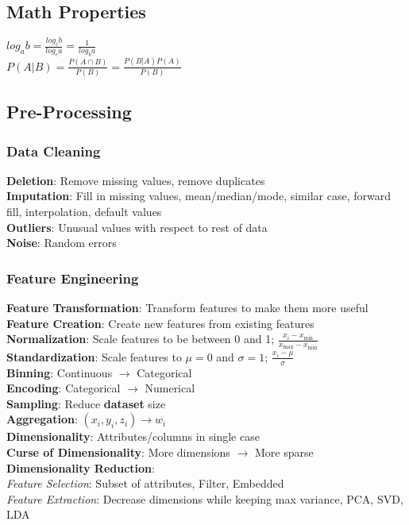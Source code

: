 \documentclass{article}
\author{Ian Chen}
\date{\today}
\begin{document}
    \begin{multicols*}{2}
        \subsection*{Math Properties}
        $log_a b = \frac{log_c b}{log_c a} = \frac{1}{log_b a}$\\
        $P(A|B) = \frac{P(A \cap B)}{P(B)} = \frac{P(B|A)P(A)}{P(B)}$\\
        \subsection*{Pre-Processing}
        \subsubsection*{Data Cleaning}
        \textbf{Deletion}: Remove missing values, remove duplicates\\
        \textbf{Imputation}: Fill in missing values, mean/median/mode, similar case, forward fill,
        interpolation, default values\\
        \textbf{Outliers}: Unusual values with respect to rest of data\\
        \textbf{Noise}: Random errors\\
        \subsubsection*{Feature Engineering}
        \textbf{Feature Transformation}: Transform features to make them more useful\\
        \textbf{Feature Creation}: Create new features from existing features\\
        \textbf{Normalization}: Scale features to be between 0 and 1; $\frac{x_i - x_{\min}}{x_
                {\max} - x_{\min}}$\\
        \textbf{Standardization}: Scale features to $\mu = 0$ and $\sigma = 1$; $\frac{x_i - \mu}{
            \sigma}$\\
        \textbf{Binning}: Continuous $\to$ Categorical\\
        \textbf{Encoding}: Categorical $\to$ Numerical\\
        \textbf{Sampling}: Reduce \textbf{dataset} size\\
        \textbf{Aggregation}: $(x_i, y_i, z_i) \to w_i$\\
        \textbf{Dimensionality}: Attributes/columns in single case\\
        \textbf{Curse of Dimensionality}: More dimensions $\to$ More sparse\\
        \textbf{Dimensionality Reduction}:\\
        \textit{Feature Selection}: Subset of attributes, Filter, Embedded\\
        \textit{Feature Extraction}: Decrease dimensions while keeping max variance, PCA, SVD, LDA\\

\end{multicols*}
\end{document}

